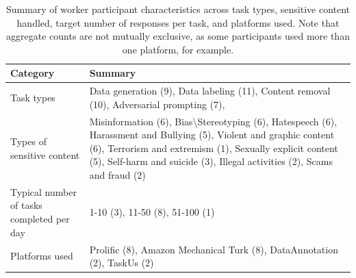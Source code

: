 \begin{table}
\centering
\small
\begin{tabular}{p{2cm} p{5cm}}
\toprule
\textbf{Category} & \textbf{Summary} \\
\midrule
Task types 
& Data generation (9), Data labeling (11), Content removal (10), Adversarial prompting (7), \\

Types of sensitive content 
& Misinformation (6), Bias\textbackslash Stereotyping (6), Hatespeech (6), Harassment and Bullying (5), Violent and graphic content (6), Terrorism and extremism (1), Sexually explicit content (5), Self-harm and suicide (3), Illegal activities (2), Scams and fraud (2) \\

Typical number of tasks completed per day
& 1-10 (3), 11-50 (8), 51-100 (1) \\

Platforms used 
&  Prolific (8), Amazon Mechanical Turk (8), DataAnnotation (2), TaskUs (2)\\
\bottomrule
\end{tabular}
\caption{Summary of worker participant characteristics across task types, sensitive content handled, target number of responses per task, and platforms used. Note that aggregate counts are not mutually exclusive, as some participants used more than one platform, for example.}
\label{tab:participant_summary_worker}
\end{table}

